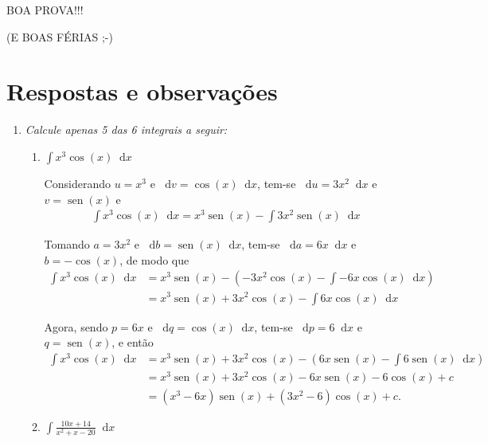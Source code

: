\documentclass[12pt,a4paper]{article}
\newcommand*\diff{\mathop{}\!\mathrm{d}}
\newcommand*\sen{\operatorname{sen}}
\begin{document}
\begin{center}
BOA PROVA!!!
\end{center}
\begin{center}
(E BOAS FÉRIAS ;-)
\end{center}

\newpage
\restoregeometry
\section*{Respostas e observações}

\begin{enumerate}

\item \textit{Calcule apenas 5 das 6 integrais a seguir:}

\begin{enumerate}
\item $\displaystyle \int x^3 \cos(x) \diff x$

Considerando $u = x^3$ e $\diff v = \cos(x) \diff x$, tem-se $\diff u=3x^2 \diff x$ e $v = \sen(x)$ e
\begin{align*}
\int x^3 \cos(x) \diff x
= x^3 \sen(x) - \int 3x^2 \sen(x) \diff x
\end{align*}

Tomando $a = 3x^2$ e $\diff b = \sen(x) \diff x$, tem-se $\diff a=6x \diff x$ e $b = -\cos(x)$, de modo que
\begin{align*}
\int x^3 \cos(x) \diff x
& = x^3 \sen(x) - \left( - 3x^2 \cos(x) - \int -6x \cos(x) \diff x \right) \\
& = x^3 \sen(x) + 3x^2 \cos(x) - \int 6x \cos(x) \diff x
\end{align*}

Agora, sendo $p = 6x$ e $\diff q = \cos(x) \diff x$, tem-se $\diff p=6 \diff x$ e $q = \sen(x)$, e então
\begin{align*}
\int x^3 \cos(x) \diff x
& = x^3 \sen(x) + 3x^2 \cos(x) - \left( 6x \sen(x) - \int 6\sen(x) \diff x \right) \\
& = x^3 \sen(x) + 3x^2 \cos(x) - 6x \sen(x) - 6 \cos(x) + c \\
& = (x^3 - 6x) \sen(x) + (3x^2 - 6) \cos(x) + c.
\end{align*}

\item $\displaystyle \int \frac{10 x+14}{x^2+x-20} \diff x$


\end{enumerate}
\end{enumerate}
\end{document}
